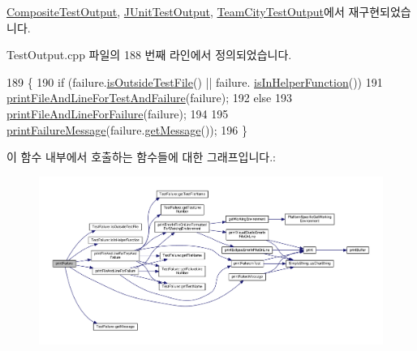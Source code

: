 \hyperlink{class_composite_test_output_abda4b89457f485fa538443ee10aecfe8}{Composite\+Test\+Output}, \hyperlink{class_j_unit_test_output_a5c917b949750083f7774dbcf412cfbc5}{J\+Unit\+Test\+Output}, \hyperlink{class_team_city_test_output_a5c917b949750083f7774dbcf412cfbc5}{Team\+City\+Test\+Output}에서 재구현되었습니다.



Test\+Output.\+cpp 파일의 188 번째 라인에서 정의되었습니다.


\begin{DoxyCode}
189 \{
190     \textcolor{keywordflow}{if} (failure.\hyperlink{class_test_failure_a977b24b749f7dc0d279fed902991c7b4}{isOutsideTestFile}() || failure.
      \hyperlink{class_test_failure_a8658daf09d68f724672ed9c7b1d94e95}{isInHelperFunction}())
191         \hyperlink{class_test_output_ae20c439e68036cc705a86d9a95954168}{printFileAndLineForTestAndFailure}(failure);
192     \textcolor{keywordflow}{else}
193         \hyperlink{class_test_output_a1d78706f5181a464f5fafb178d231be9}{printFileAndLineForFailure}(failure);
194 
195     \hyperlink{class_test_output_ab13cdfa930cc1ad29b36b1ab7ff77a99}{printFailureMessage}(failure.\hyperlink{class_test_failure_a55ca73e984d01e477b9cc990acf7dffd}{getMessage}());
196 \}
\end{DoxyCode}


이 함수 내부에서 호출하는 함수들에 대한 그래프입니다.\+:
\nopagebreak
\begin{figure}[H]
\begin{center}
\leavevmode
\includegraphics[width=350pt]{class_test_output_abda4b89457f485fa538443ee10aecfe8_cgraph}
\end{center}
\end{figure}





